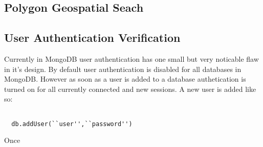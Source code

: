 \documentclass{../dependencies/acm_proc_article-sp}
\begin{document}
\subsection{Polygon Geospatial Seach}

\subsection{User Authentication Verification}
Currently in MongoDB user authentication has one small but very noticable flaw in it's design.
By default user authentication is disabled for all databases in MongoDB. However as soon as a
user is added to a database authetication is turned on for all currently connected and new sessions.
A new user is added like so:
\begin{lstlisting}

  db.addUser(``user'',``password'')
\end{lstlisting}

Once 




\newpage
%

%
%
\balancecolumns
\end{document}
